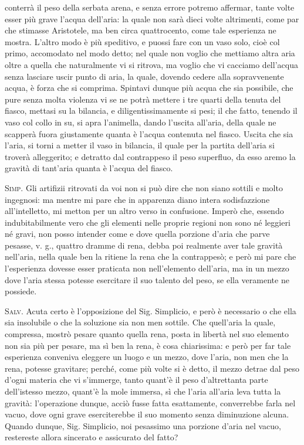 \documentclass[11pt,twoside,openany]{book}
\newcommand{\speaker}[1]{\textcolor{rubric}{\textsc{#1}}\space}
\begin{document}
conterrà il peso della serbata arena, e senza errore potremo affermar, tante volte esser più grave l'acqua dell'aria: la quale non sarà dieci volte altrimenti, come par che stimasse Aristotele, ma ben circa quattrocento, come tale esperienza ne mostra. L'altro modo è più speditivo, e puossi fare con un vaso solo, cioè col primo, accomodato nel modo detto; nel quale non voglio che mettiamo altra aria oltre a quella che naturalmente vi si ritrova, ma voglio che vi cacciamo dell'acqua senza lasciare uscir punto di aria, la quale, dovendo cedere alla sopravvenente acqua, è forza che si comprima. Spintavi dunque più acqua che sia possibile, che pure senza molta violenza vi se ne potrà mettere i tre quarti della tenuta del fiasco, mettasi su la bilancia, e diligentissimamente si pesi; il che fatto, tenendo il vaso col collo in su, si apra l'animella, dando l'uscita all'aria, della quale ne scapperà fuora giustamente quanta è l'acqua contenuta nel fiasco. Uscita che sia l'aria, si torni a metter il vaso in bilancia, il quale per la partita dell'aria si troverà alleggerito; e detratto dal contrappeso il peso superfluo, da esso aremo la gravità di tant'aria quanta è l'acqua del fiasco.

\speaker{Simp.} Gli artifizii ritrovati da voi non si può dire che non siano sottili e molto ingegnosi: ma mentre mi pare che in apparenza diano intera sodisfazzione all'intelletto, mi metton per un altro verso in confusione. Imperò che, essendo indubitabilmente vero che gli elementi nelle proprie regioni non sono né leggieri né gravi, non posso intender come e dove quella porzione d'aria che parve pesasse, v. g., quattro dramme di rena, debba poi realmente aver tale gravità nell'aria, nella quale ben la ritiene la rena che la contrappesò; e però mi pare che l'esperienza dovesse esser praticata non nell'elemento dell'aria, ma in un mezzo dove l'aria stessa potesse esercitare il suo talento del peso, se ella veramente ne possiede.

\speaker{Salv.} Acuta certo è l'opposizione del Sig. Simplicio, e però è necessario o che ella sia insolubile o che la soluzione sia non men sottile. Che quell'aria la quale, compressa, mostrò pesare quanto quella rena, posta in libertà nel suo elemento non sia più per pesare, ma sì ben la rena, è cosa chiarissima: e però per far tale esperienza conveniva eleggere un luogo e un mezzo, dove l'aria, non men che la rena, potesse gravitare; perché, come più volte si è detto, il mezzo detrae dal peso d'ogni materia che vi s'immerge, tanto quant'è il peso d'altrettanta parte dell'istesso mezzo, quant'è la mole immersa, sì che l'aria all'aria leva tutta la gravità: l'operazione dunque, acciò fusse fatta esattamente, converrebbe farla nel vacuo, dove ogni grave eserciterebbe il suo momento senza diminuzione alcuna. Quando dunque, Sig. Simplicio, noi pesassimo una porzione d'aria nel vacuo, restereste allora sincerato e assicurato del fatto?
\end{document}
